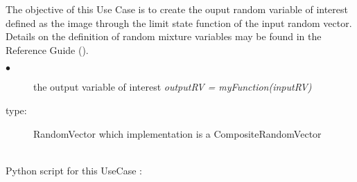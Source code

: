 \renewcommand{\filename}{docUC_OVI_FromLSF.tex}
\renewcommand{\filetitle}{UC : Creation of the ouput random vector}

\HeaderIIILevel

\label{CompositeRandomVector}



The objective of this Use Case is to create the ouput random variable of interest defined as the image through the limit state function of the input random vector.\\

Details on the definition of random mixture variables may be found in the Reference Guide ().\\

             {
               \begin{description}
               \item[$\bullet$] the output variable of interest {\itshape outputRV = myFunction(inputRV)}
               \item[type:] RandomVector which implementation is a CompositeRandomVector
               \end{description}
             }

             \textspace\\
             Python script for this UseCase :


